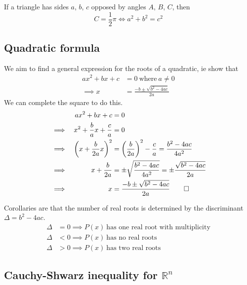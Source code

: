 \documentclass[fleqn,a4paper,11pt]{article}
\begin{document}

    If a triangle has sides \(a\), \(b\), \(c\) opposed by angles \(A\), \(B\),
    \(C\), then
    \begin{equation}
    C = \frac 12 \pi \iff a^2 + b^2 = c^2
    \end{equation}

    \subsection{Quadratic formula} \label{sec_quad_formula}

    We aim to find a general expression for the roots of a quadratic, ie show
    that
    \begin{equation}
    \begin{split}
    ax^2 + bx + c &= 0\ \text{where}\ a \neq 0 \\
    \implies x &= \frac{-b \pm \sqrt{b^2 - 4ac}}{2a}
    \end{split}
    \end{equation}
    We can complete the square to do this.
    \begin{alignat*}{2}
    &&ax^2 + bx + c &= 0 \\
    &\implies& x^2 + \frac{b}{a}x + \frac{c}{a} &= 0 \\
    &\implies& \pqty{x + \frac{b}{2a}x}^2 &= \pqty{\frac{b}{2a}}^2 - \frac{c}{a}
        = \frac{b^2 - 4ac}{4a^2} \\
    &\implies& x + \frac{b}{2a} &= \pm \sqrt{\frac{b^2 - 4ac}{4a^2}}
        = \pm \frac{\sqrt{b^2 - 4ac}}{2a} \\
    &\implies& x &= \frac{-b \pm \sqrt{b^2 - 4ac}}{2a} \qed
    \end{alignat*}

    Corollaries are that the number of real roots is determined by the
    discriminant \({\Delta = b^2 - 4ac}\).
    \begin{align}
    \Delta &= 0 \implies P(x)\ \text{has one real root with multiplicity} \\
    \Delta &< 0 \implies P(x)\ \text{has no real roots} \\
    \Delta &> 0 \implies P(x)\ \text{has two real roots}
    \end{align}

    \subsection[Cauchy-Shwarz inequality for \(\mathbb R^n\)]
               {Cauchy-Shwarz inequality for \boldmath\(\mathbb R^n\)}
\end{document}
